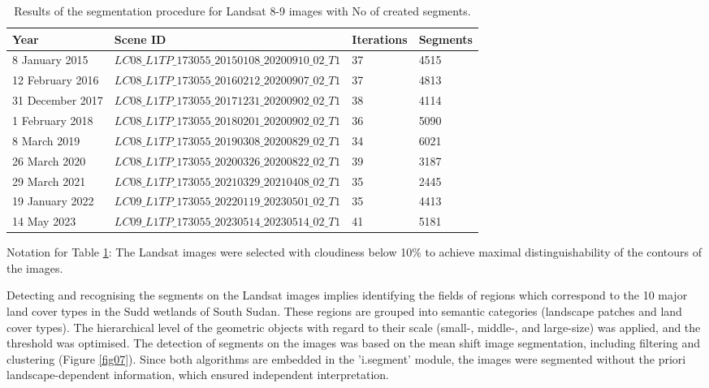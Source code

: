 \documentclass[analytics,article,accept,pdftex,moreauthors]{Definitions/mdpi}
\begin{document}
\begin{table}[H] 
\caption{Results of the segmentation procedure for Landsat 8-9 images with No of created segments.\label{tab03}}
\begin{tabularx}{\textwidth}{p{2.5cm}p{6.8cm}p{1.5cm}p{2.7cm}}
\toprule
\textbf{Year} & \textbf{Scene ID} & \textbf{Iterations} & \textbf{Segments} \\
\midrule
8 January 2015 & $LC08\_L1TP\_173055\_20150108\_20200910\_02\_T1$ & 37 & 4515  \\
12 February 2016 & $LC08\_L1TP\_173055\_20160212\_20200907\_02\_T1$ & 37 & 4813  \\
31 December 2017 & $LC08\_L1TP\_173055\_20171231\_20200902\_02\_T1$ & 38 & 4114  \\
1 February 2018 & $LC08\_L1TP\_173055\_20180201\_20200902\_02\_T1$ & 36 & 5090  \\
8 March 2019 & $LC08\_L1TP\_173055\_20190308\_20200829\_02\_T1$ & 34 & 6021  \\
26 March 2020 & $LC08\_L1TP\_173055\_20200326\_20200822\_02\_T1$ & 39 & 3187  \\
29 March 2021 & $LC08\_L1TP\_173055\_20210329\_20210408\_02\_T1$ & 35 & 2445  \\
19 January 2022 & $LC09\_L1TP\_173055\_20220119\_20230501\_02\_T1$ & 35 & 4413  \\
14 May 2023 & $LC09\_L1TP\_173055\_20230514\_20230514\_02\_T1$ & 41 & 5181  \\
\bottomrule
\end{tabularx}
      \noindent\footnotesize
      	  {Notation for Table \ref{tab03}}: %
 The Landsat images were selected with cloudiness below 10\% to achieve maximal distinguishability of the contours of the images. %
\end{table}

Detecting and recognising the segments on the Landsat images implies identifying the fields of regions which correspond to the 10 major  land cover types in the Sudd wetlands of South Sudan. These regions are grouped into  semantic categories (landscape patches and land cover types). The hierarchical level of the geometric objects with regard to their scale (small-, middle-, and large-size) was applied, and the threshold was optimised. The detection of segments on the images was based on the mean shift image segmentation, including filtering and clustering (Figure \ref{fig07}). Since both algorithms are embedded in the 'i.segment' module, the images were segmented without the priori landscape-dependent information, which ensured independent interpretation.  
\end{document}
